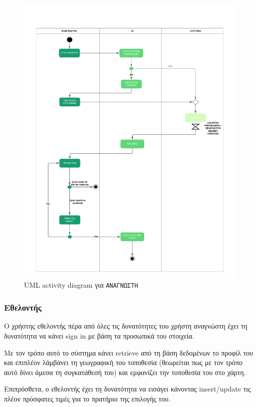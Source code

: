 \begin{figure}
	\centering\includegraphics[width = \linewidth]{uml/reader.png}
	\caption{UML activity diagram για \texttt{ΑΝΑΓΝΩΣΤΗ}}
	\label{reader}
\end{figure}


\subsubsection*{Εθελοντής}

Ο χρήστης εθελοντής πέρα από όλες τις δυνατότητες του χρήστη αναγνώστη έχει τη δυνατότητα να κάνει sign in με βάση τα προσωπικά του στοιχεία. 

Με τον τρόπο αυτό το σύστημα κάνει retrieve από τη βάση δεδομένων το προφίλ του και επιπλέον λάμβάνει τη γεωγραφική του τοποθεσία (θεωρείται πως με τον τρόπο αυτό δίνει άμεσα τη συγκατάθεσή του) και εμφανίζει την τοποθεσία του στο χάρτη.

Επιπρόσθετα, ο εθελοντής έχει τη δυνατότητα να εισάγει κάνοντας insert/update τις πλέον πρόσφατες τιμές για το πρατήριο της επιλογής του.

